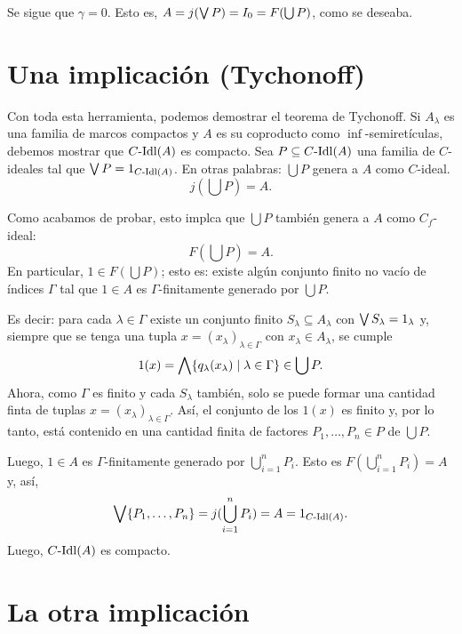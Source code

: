     Se sigue que $\gamma=0$.
    Esto es, $A=j(\bigvee P) = I_0 = F(\bigcup P)$, como se deseaba.

\section{Una implicación (Tychonoff)}
    Con toda esta herramienta, podemos demostrar el teorema
    de Tychonoff.
    Si $A_\lambda$ es una familia de marcos compactos y $A$
    es su coproducto como $\inf$-semiretículas,
    debemos mostrar que $C\text{-}\mathrm{Idl}(A)$ es compacto.
    Sea $P\subseteq C\text{-}\mathrm{Idl}(A)$ una familia de $C$-ideales tal que
    $\bigvee P = 1_{C\text{-}\mathrm{Idl}(A)}$.
    En otras palabras: $\bigcup P$ genera a $A$ como $C$-ideal.
    \[
        j(\bigcup P) = A
    .\]
    
    Como acabamos de probar, esto implca que $\bigcup P$ también
    genera a $A$ como $C_f$-ideal:
    \[
        F(\bigcup P)=A
    .\]
    En particular, $1\in F(\bigcup P)$; esto es:
    existe algún conjunto finito no vacío de índices $\Gamma$
    tal que $1\in A$ es $\Gamma$-finitamente generado por
    $\bigcup P$.

    Es decir: para cada $\lambda\in\Gamma$ existe un conjunto
    finito $S_\lambda\subseteq A_\lambda$
    con $\bigvee S_\lambda = 1_\lambda$
    y, siempre que se tenga una tupla
    $x=(x_\lambda)_{\lambda\in\Gamma}$
    con $x_\lambda\in A_\lambda$,
    se cumple
    \[
        1(x)
        =\bigwedge\{q_\lambda(x_\lambda)\mid\lambda\in\Gamma\}
        \in\bigcup P
    .\]
    Ahora, como $\Gamma$ es finito y cada $S_\lambda$
    también, solo se puede formar
    una cantidad finta de tuplas
    $x=(x_\lambda)_{\lambda\in\Gamma}$.
    Así, el conjunto de los $1(x)$ es finito y, por lo tanto,
    está contenido en una cantidad finita de factores
    $P_1,\dots,P_n\in P$ de $\bigcup P$.
    
    Luego, $1\in A$ es $\Gamma$-finitamente generado
    por $\bigcup_{i=1}^nP_i$.
    Esto es $F(\bigcup_{i=1}^n P_i)=A$ y, así,
    \[
        \bigvee\{P_1,\dots,P_n\}
        = j(\bigcup_{i=1}^nP_i)
        = A
        = 1_{C\text{-}\mathrm{Idl}(A)}
    .\]
    Luego, $C\text{-}\mathrm{Idl}(A)$ es compacto.


\section{La otra implicación}

